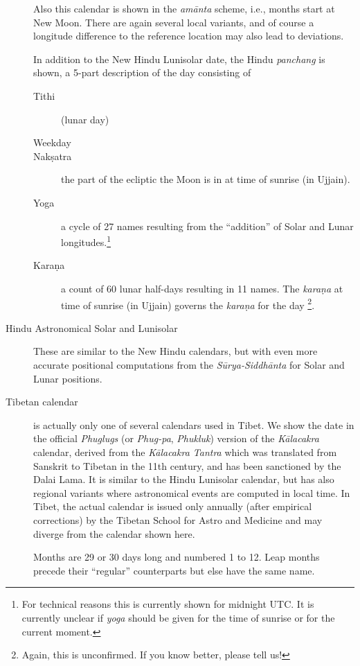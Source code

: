 \begin{description}
  Also this calendar is shown in the \emph{am\=anta} scheme, i.e.,
  months start at New Moon. There are again several local variants,
  and of course a longitude difference to the reference location may
  also lead to deviations.

  In addition to the New Hindu Lunisolar date, the Hindu \emph{panchang} is shown, a 5-part description of the day consisting of
  \begin{description}
  \item[Tithi] (lunar day)
  \item[Weekday]
  \item[Nak\d{s}atra] the part of the ecliptic the Moon is in at time of sunrise (in Ujjain).
  \item[Yoga] a cycle of 27 names resulting from the ``addition'' of
    Solar and Lunar longitudes.\footnote{For technical reasons this
      is currently shown for midnight UTC. It is currently unclear if
      \emph{yoga} should be given for the time of sunrise or for the
      current moment.}
  \item[Kara\d{n}a] a count of 60 lunar half-days resulting in 11
    names. The \emph{kara\d{n}a} at time of sunrise (in Ujjain)
    governs the \emph{kara\d{n}a} for the day \footnote{Again, this is
      unconfirmed. If you know better, please tell us!}.
  \end{description}
  
\item[Hindu Astronomical Solar and Lunisolar] These are similar to the
  New Hindu calendars, but with even more accurate
  positional computations from the \emph{S\=urya-Siddh\=anta} for
  Solar and Lunar positions.
\item[Tibetan calendar] is actually only one of several calendars%
   used in Tibet. We show the date in the official
  \emph{Phuglugs} (or \emph{Phug-pa}, \emph{Phukluk}) version of the
  \emph{K\=alacakra} calendar, derived from the \emph{K\=alacakra
    Tantra} which was translated from Sanskrit to Tibetan in the 11th
  century, and has been sanctioned by the Dalai Lama. It is similar to
  the Hindu Lunisolar calendar, but has also regional variants where
  astronomical events are computed in local time. In Tibet, the actual
  calendar is issued only annually (after empirical corrections) by
  the Tibetan School for Astro and Medicine and may diverge from the
  calendar shown here.

  Months are 29 or 30 days long and numbered 1 to 12. Leap months
  precede their ``regular'' counterparts but else have the same name.


\end{description}
